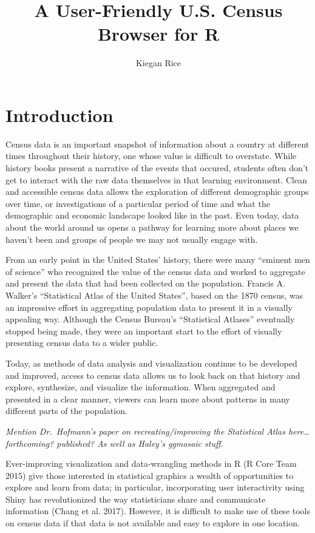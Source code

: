 \documentclass[11pt,]{article}
\title{A User-Friendly U.S. Census Browser for R}
\author{Kiegan Rice}
\date{}
\begin{document}
\maketitle

\section{Introduction}

Census data is an important snapshot of information about a country at
different times throughout their history, one whose value is difficult
to overstate. While history books present a narrative of the events that
occured, students often don't get to interact with the raw data
themselves in that learning environment. Clean and accessible census
data allows the exploration of different demographic groups over time,
or investigations of a particular period of time and what the
demographic and economic landscape looked like in the past. Even today,
data about the world around us opens a pathway for learning more about
places we haven't been and groups of people we may not usually engage
with.

From an early point in the United States' history, there were many
``eminent men of science'' who recognized the value of the census data
and worked to aggregate and present the data that had been collected on
the population. Francis A. Walker's ``Statistical Atlas of the United
States'', based on the 1870 census, was an impressive effort in
aggregating population data to present it in a visually appealing way.
Although the Census Bureau's ``Statistical Atlases'' eventually stopped
being made, they were an important start to the effort of visually
presenting census data to a wider public.

Today, as methods of data analysis and visualization continue to be
developed and improved, access to census data allows us to look back on
that history and explore, synthesize, and visualize the information.
When aggregated and presented in a clear manner, viewers can learn more
about patterns in many different parts of the population.

\emph{Mention Dr.~Hofmann's paper on recreating/improving the
Statistical Atlas here\ldots{} forthcoming? published? As well as
Haley's ggmosaic stuff.}

Ever-improving visualization and data-wrangling methods in R (R Core
Team 2015) give those interested in statistical graphics a wealth of
opportunities to explore and learn from data; in particular,
incorporating user interactivity using Shiny has revolutionized the way
statisticians share and communicate information (Chang et al. 2017).
However, it is difficult to make use of these tools on census data if
that data is not available and easy to explore in one location.
\end{document}
